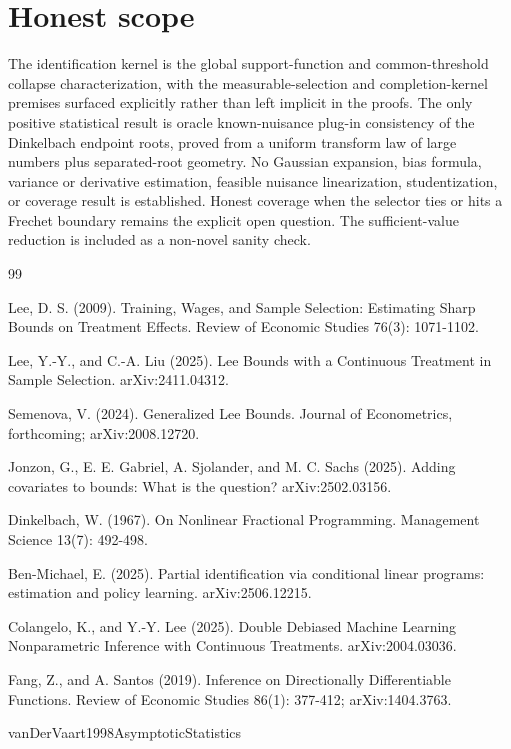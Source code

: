 \documentclass{article}
\begin{document}
\section{Honest scope}

The identification kernel is the global support-function and common-threshold collapse characterization, with the measurable-selection and completion-kernel premises surfaced explicitly rather than left implicit in the proofs. The only positive statistical result is oracle known-nuisance plug-in consistency of the Dinkelbach endpoint roots, proved from a uniform transform law of large numbers plus separated-root geometry. No Gaussian expansion, bias formula, variance or derivative estimation, feasible nuisance linearization, studentization, or coverage result is established. Honest coverage when the selector ties or hits a Frechet boundary remains the explicit open question. The sufficient-value reduction is included as a non-novel sanity check.

\begin{thebibliography}{99}

   Lee, D. S. (2009). Training, Wages, and Sample Selection: Estimating Sharp Bounds on Treatment Effects. Review of Economic Studies 76(3): 1071-1102.

   Lee, Y.-Y., and C.-A. Liu (2025). Lee Bounds with a Continuous Treatment in Sample Selection. arXiv:2411.04312.

   Semenova, V. (2024). Generalized Lee Bounds. Journal of Econometrics, forthcoming; arXiv:2008.12720.

   Jonzon, G., E. E. Gabriel, A. Sjolander, and M. C. Sachs (2025). Adding covariates to bounds: What is the question? arXiv:2502.03156.

   Dinkelbach, W. (1967). On Nonlinear Fractional Programming. Management Science 13(7): 492-498.

   Ben-Michael, E. (2025). Partial identification via conditional linear programs: estimation and policy learning. arXiv:2506.12215.

   Colangelo, K., and Y.-Y. Lee (2025). Double Debiased Machine Learning Nonparametric Inference with Continuous Treatments. arXiv:2004.03036.

   Fang, Z., and A. Santos (2019). Inference on Directionally Differentiable Functions. Review of Economic Studies 86(1): 377-412; arXiv:1404.3763.

   vanDerVaart1998AsymptoticStatistics

\end{thebibliography}
\end{document}

